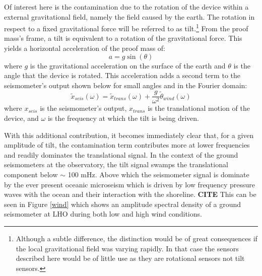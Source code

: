 \documentclass [12pt, proquest]{uwthesis}[2019]
\begin{document}
Of interest here is the contamination due to the rotation of the device within a external gravitational field, namely the field caused by the earth. The rotation in respect to a fixed gravitational force will be referred to as tilt.\footnote{Although a subtle difference, the distinction would be of great consequences if the local gravitational field was varying rapidly. In that case the sensors described here would be of little use as they are rotational sensors not tilt sensors.} From the proof mass's frame, a tilt is equivalent to a rotation of the gravitational force. This yields a horizontal acceleration of the proof mass of:
\[ a=g \sin(\theta)\]
where $g$ is the gravitational acceleration on the surface of the earth and $\theta$ is the angle that the device is rotated. This acceleration adds a second term to the seismometer's output shown below for small angles and in the Fourier domain:
\[\tilde{x}_{seis}(\omega)=\tilde{x}_{trans}(\omega)+\frac{g}{\omega^2}\tilde{\theta}_{wind}(\omega)\]
where $x_{seis}$ is the seismometer's output, $x_{trans}$ is the translational motion of the device, and $\omega$ is the frequency at which the tilt is being driven. 

With this additional contribution, it becomes immediately clear that, for a given amplitude of tilt, the contamination term contributes more at lower frequencies and readily dominates the translational signal. In the context of the ground seismometers at the observatory, the tilt signal swamps the translational component below $\sim$ 100 mHz. Above which the seismometer signal is dominate by the ever present oceanic microseism which is driven by low frequency pressure waves with the ocean and their interaction with the shoreline. \textbf{CITE} This can be seen in Figure \ref{wind} which shows an amplitude spectral density of a ground seismometer at LHO during both low and high wind conditions.
\end{document}
